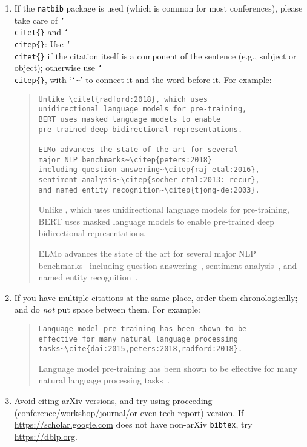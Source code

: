 \begin{enumerate}
  \item If the \texttt{natbib} package is used (which is common for most conferences), please take care of \texttt{\char`\\citet\{\}} and \texttt{\char`\\citep\{\}}: Use \texttt{\char`\\citet\{\}} if the citation itself is a component of the sentence (e.g., subject or object); otherwise use \texttt{\char`\\citep\{\}}, with `\texttt{\char`\~}' to connect it and the word before it. For example:
  \begin{quote}\begin{scriptsize}
    \begin{verbatim}
Unlike \citet{radford:2018}, which uses
unidirectional language models for pre-training,
BERT uses masked language models to enable
pre-trained deep bidirectional representations.

ELMo advances the state of the art for several
major NLP benchmarks~\citep{peters:2018}
including question answering~\citep{raj-etal:2016},
sentiment analysis~\citep{socher-etal:2013:_recur},
and named entity recognition~\citep{tjong-de:2003}.
    \end{verbatim}
    Unlike \citet{radford:2018}, which uses unidirectional language models for pre-training, BERT uses masked language models to enable pre-trained deep bidirectional representations.

    ELMo advances the state of the art for several major NLP benchmarks~\citep{peters:2018} including question answering~\citep{raj-etal:2016}, sentiment analysis~\citep{socher-etal:2013:_recur}, and named entity recognition~\citep{tjong-de:2003}.
  \end{scriptsize}\end{quote}

  \item If you have multiple citations at the same place, order them chronologically; and do \textit{not} put space between them. For example:
  \begin{quote}\begin{scriptsize}
    \begin{verbatim}
Language model pre-training has been shown to be
effective for many natural language processing
tasks~\cite{dai:2015,peters:2018,radford:2018}.
    \end{verbatim}

    Language model pre-training has been shown to be effective for many natural language processing tasks~\cite{dai:2015,peters:2018,radford:2018}.
  \end{scriptsize}\end{quote}

  \item Avoid citing arXiv versions, and try using proceeding (conference/workshop/journal/or even tech report) version. If \url{https://scholar.google.com} does not have non-arXiv \texttt{bibtex}, try \url{https://dblp.org}.
\end{enumerate}
